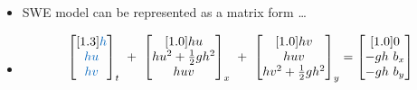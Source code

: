 \begin{frame}
\begin{minipage}{0.35\textwidth}
\begin{itemize}
\item<1->[] SWE model can be represented as a {\color{TUMBlauDunkel}matrix} form \dots
\item<1->[]
\begin{align*}
\vspace{-15pt}
&\begin{bmatrix}[1.3]
\myTUMdarkblue{h}\\
\myTUMdarkblue{hu}\\
\myTUMdarkblue{hv}\\
\end{bmatrix}_t \ + \
\begin{bmatrix}[1.0]
hu\\
hu^2 + \frac{1}{2}gh^2\\
huv\\
\end{bmatrix}_x\ + \
\begin{bmatrix}[1.0]
hv\\
huv\\
hv^2 + \frac{1}{2}gh^2\\
\end{bmatrix}_y =
\begin{bmatrix}[1.0]
0\\
-gh\ b_x\\
-gh\ b_y
\end{bmatrix}\\[2em]

\end{align*}
\end{itemize}
\end{minipage}
\end{frame}
